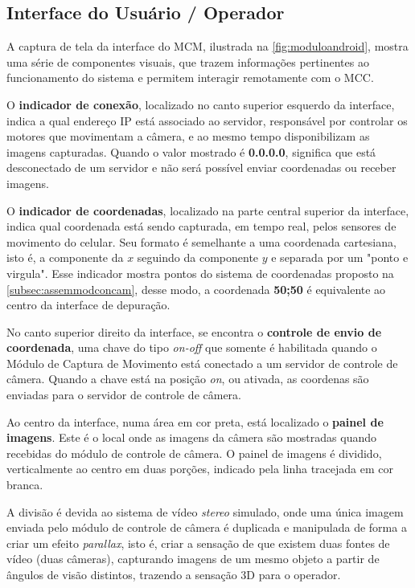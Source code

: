 \subsection{Interface do Usuário / Operador}
\label{subsec:interfaceusuariooperador}

A captura de tela da interface do MCM, ilustrada na \autoref{fig:moduloandroid}, mostra uma série de componentes visuais, que trazem informações pertinentes ao funcionamento do sistema e permitem interagir remotamente com o MCC. \par

O \textbf{indicador de conexão}, localizado no canto superior esquerdo da interface, indica a qual endereço IP está associado ao servidor, responsável por controlar os motores que movimentam a câmera, e ao mesmo tempo disponibilizam as imagens capturadas. Quando o valor mostrado é \textbf{0.0.0.0}, significa que está desconectado de um servidor e não será possível enviar coordenadas ou receber imagens.\par

O \textbf{indicador de coordenadas}, localizado na parte central superior da interface, indica qual coordenada está sendo capturada, em tempo real, pelos sensores de movimento do celular. Seu formato é semelhante a uma coordenada cartesiana, isto é, a componente da $x$ seguindo da componente $y$ e separada por um "ponto e virgula". Esse indicador mostra pontos do sistema de coordenadas proposto na \autoref{subsec:assemmodconcam}, desse modo, a coordenada \textbf{50;50} é equivalente ao centro da interface de depuração.\par

No canto superior direito da interface, se encontra o \textbf{controle de envio de coordenada}, uma chave do tipo \textit{on-off} que somente é habilitada quando o Módulo de Captura de Movimento está conectado a um servidor de controle de câmera. Quando a chave está na posição \textit{on}, ou ativada, as coordenas são enviadas para o servidor de controle de câmera.\par

Ao centro da interface, numa área em cor preta, está localizado o \textbf{painel de imagens}. Este é o local onde as imagens da câmera são mostradas quando recebidas do módulo de controle de câmera. O painel de imagens é dividido, verticalmente ao centro em duas porções, indicado pela linha tracejada em cor branca.\par

A divisão é devida ao sistema de vídeo \textit{stereo} simulado, onde uma única imagem enviada pelo módulo de controle de câmera é duplicada e manipulada de forma a criar um efeito \textit{parallax}, isto é, criar a sensação de que existem duas fontes de vídeo (duas câmeras), capturando imagens de um mesmo objeto a partir de ângulos de visão distintos, trazendo a sensação 3D para o operador.\par

